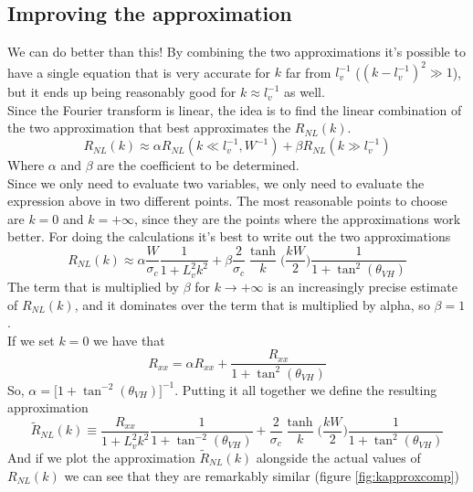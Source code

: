 \subsection{Improving the approximation}
We can do better than this! By combining the two approximations it's possible to have a single equation that is very accurate for $k$ far from $l_v^{-1}$ ($(k-l_v^{-1})^2\gg 1$), but it ends up being reasonably good for $k\approx l_v^{-1}$ as well.\\
Since the Fourier transform is linear, the idea is to find the linear combination of the two approximation that best approximates the $R_{NL}(k)$.
\[
    R_{NL}(k)\approx \alpha R_{NL}(k\ll l_v^{-1},W^{-1}) +\beta R_{NL}(k\gg l_v^{-1})
\]
Where $\alpha$ and $\beta$ are the coefficient to be determined.\\
Since we only need to evaluate two variables, we only need to evaluate the expression above in two different points. The most reasonable points to choose are $k=0$ and $k=+\infty$, since they are the points where the approximations work better. For doing the calculations it's best to write out the two approximations 
\[
    R_{NL}(k)\approx 
    \alpha \frac W{\sigma_c}\frac 1{1+L_v^2k^2}+
    \beta\frac 2{\sigma_c}\frac{\tanh}k\bigg(\frac{kW}2\bigg)\frac 1{1+\tan^2(\theta_{VH})}
\]
The term that is multiplied by $\beta$ for $k\to +\infty$ is an increasingly precise estimate of $R_{NL}(k)$, and it dominates over the term that is multiplied by alpha, so $\beta=1$.\\
If we set $k=0$ we have that
\[
    R_{xx}=\alpha R_{xx} +  \frac {R_{xx}}{1+\tan^2(\theta_{VH})}   
\]
So, $\alpha=\big[1+\tan^{-2}(\theta_{VH})\big]^{-1}$. Putting it all together we define the resulting approximation
\begin{equation}
    \boxed{
        \tilde R_{NL}(k)\equiv
        \frac {R_{xx}}{1+L_v^2k^2}\frac 1{1+\tan^{-2}(\theta_{VH})}+
        \frac 2{\sigma_c}\frac{\tanh}k\bigg(\frac{kW}2\bigg)\frac 1{1+\tan^2(\theta_{VH})}
    }
\end{equation}
And if we plot the approximation $\tilde R_{NL}(k)$ alongside the actual values of $R_{NL}(k)$ we can see that they are remarkably similar (figure \ref{fig:kapproxcomp})
